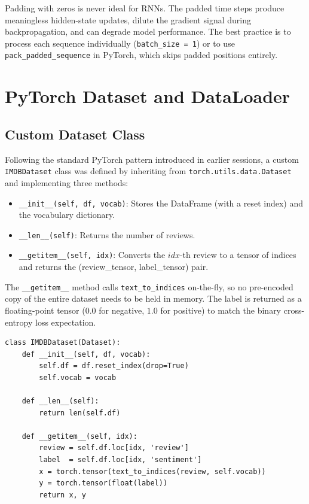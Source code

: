 \documentclass[12pt,a4paper]{article}
\begin{document}
\begin{warningbox}
  Padding with zeros is never ideal for RNNs.  The padded time steps
  produce meaningless hidden-state updates, dilute the gradient signal
  during backpropagation, and can degrade model performance.  The
  best practice is to process each sequence individually
  (\texttt{batch\_size = 1}) or to use \texttt{pack\_padded\_sequence}
  in PyTorch, which skips padded positions entirely.
\end{warningbox}

\section{PyTorch Dataset and DataLoader}
\label{sec:dataset_dataloader}

\subsection{Custom Dataset Class}
\label{subsec:custom_dataset}

Following the standard PyTorch pattern introduced in earlier sessions,
a custom \texttt{IMDBDataset} class was defined by inheriting from
\texttt{torch.utils.data.Dataset} and implementing three methods:

\begin{itemize}[noitemsep]
  \item \texttt{\_\_init\_\_(self, df, vocab)}: Stores the DataFrame
        (with a reset index) and the vocabulary dictionary.
  \item \texttt{\_\_len\_\_(self)}: Returns the number of reviews.
  \item \texttt{\_\_getitem\_\_(self, idx)}: Converts the $idx$-th
        review to a tensor of indices and returns the
        (review\_tensor, label\_tensor) pair.
\end{itemize}

The \texttt{\_\_getitem\_\_} method calls \texttt{text\_to\_indices}
on-the-fly, so no pre-encoded copy of the entire dataset needs to be
held in memory.  The label is returned as a floating-point tensor
($0.0$ for negative, $1.0$ for positive) to match the binary
cross-entropy loss expectation.

\begin{verbatim}
class IMDBDataset(Dataset):
    def __init__(self, df, vocab):
        self.df = df.reset_index(drop=True)
        self.vocab = vocab

    def __len__(self):
        return len(self.df)

    def __getitem__(self, idx):
        review = self.df.loc[idx, 'review']
        label  = self.df.loc[idx, 'sentiment']
        x = torch.tensor(text_to_indices(review, self.vocab))
        y = torch.tensor(float(label))
        return x, y
\end{verbatim}
\end{document}
